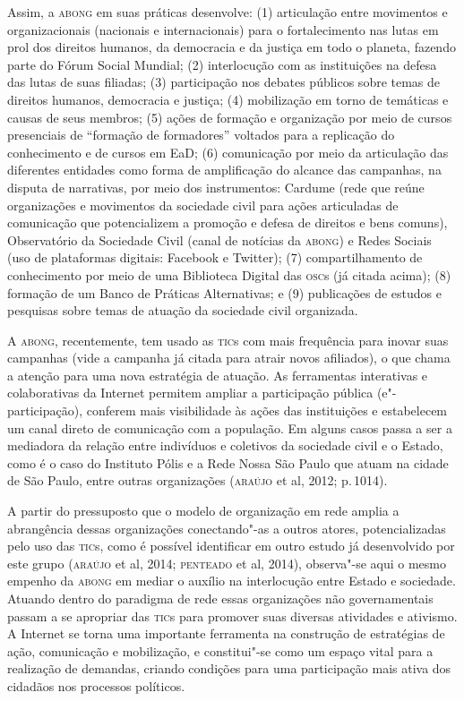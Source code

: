 Assim, a \textsc{abong} em suas práticas desenvolve: (1) articulação entre
movimentos e organizacionais (nacionais e internacionais) para o
fortalecimento nas lutas em prol dos direitos humanos, da democracia e
da justiça em todo o planeta, fazendo parte do Fórum Social Mundial; (2)
interlocução com as instituições na defesa das lutas de suas filiadas;
(3) participação nos debates públicos sobre temas de direitos humanos,
democracia e justiça; (4) mobilização em torno de temáticas e causas de
seus membros; (5) ações de formação e organização por meio de cursos
presenciais de ``formação de formadores'' voltados para a replicação do
conhecimento e de cursos em EaD; (6) comunicação por meio da articulação
das diferentes entidades como forma de amplificação do alcance das
campanhas, na disputa de narrativas, por meio dos instrumentos: Cardume
(rede que reúne organizações e movimentos da sociedade civil para ações
articuladas de comunicação que potencializem a promoção e defesa de
direitos e bens comuns), Observatório da Sociedade Civil (canal de
notícias da \textsc{abong}) e Redes Sociais (uso de plataformas digitais:
Facebook e Twitter); (7) compartilhamento de conhecimento por meio de
uma Biblioteca Digital das \textsc{osc}s (já citada acima); (8) formação de um
Banco de Práticas Alternativas; e (9) publicações de estudos e pesquisas
sobre temas de atuação da sociedade civil organizada.

A \textsc{abong}, recentemente, tem usado as \textsc{tic}s com mais frequência para inovar
suas campanhas (vide a campanha já citada para atrair novos afiliados),
o que chama a atenção para uma nova estratégia de atuação. As
ferramentas interativas e colaborativas da Internet permitem ampliar a
participação pública (e"-participação), conferem mais visibilidade às
ações das instituições e estabelecem um canal direto de comunicação com
a população. Em alguns casos passa a ser a mediadora da relação entre
indivíduos e coletivos da sociedade civil e o Estado, como é o caso do
Instituto Pólis e a Rede Nossa São Paulo que atuam na cidade de São
Paulo, entre outras organizações (\textsc{araújo} et al, 2012; p.\,1014).

A partir do pressuposto que o modelo de organização em rede amplia a
abrangência dessas organizações conectando"-as a outros atores,
potencializadas pelo uso das \textsc{tic}s, como é possível identificar em outro
estudo já desenvolvido por este grupo (\textsc{araújo} et al, 2014; \textsc{penteado} et
al, 2014), observa"-se aqui o mesmo empenho da \textsc{abong} em mediar o auxílio
na interlocução entre Estado e sociedade. Atuando dentro do paradigma de
rede essas organizações não governamentais passam a se apropriar das
\textsc{tic}s para promover suas diversas atividades e ativismo. A Internet se
torna uma importante ferramenta na construção de estratégias de ação,
comunicação e mobilização, e constitui"-se como um espaço vital para a
realização de demandas, criando condições para uma participação mais
ativa dos cidadãos nos processos políticos.

